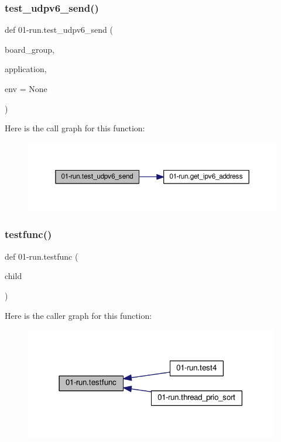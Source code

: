 \subsubsection{\texorpdfstring{test\+\_\+udpv6\+\_\+send()}{test\_udpv6\_send()}}
{\footnotesize\ttfamily def 01-\/run.\+test\+\_\+udpv6\+\_\+send (\begin{DoxyParamCaption}\item[{}]{board\+\_\+group,  }\item[{}]{application,  }\item[{}]{env = {\ttfamily None} }\end{DoxyParamCaption})}

Here is the call graph for this function\+:
\nopagebreak
\begin{figure}[H]
\begin{center}
\leavevmode
\includegraphics[width=350pt]{namespace01-run_a498ff87ebeb18334cf6110214d60bb53_cgraph}
\end{center}
\end{figure}
\mbox{\label{namespace01-run_aff983ffd4ab0e6bf8e7e58970e4a10bb}} 
\subsubsection{\texorpdfstring{testfunc()}{testfunc()}}
{\footnotesize\ttfamily def 01-\/run.\+testfunc (\begin{DoxyParamCaption}\item[{}]{child }\end{DoxyParamCaption})}

Here is the caller graph for this function\+:
\nopagebreak
\begin{figure}[H]
\begin{center}
\leavevmode
\includegraphics[width=314pt]{namespace01-run_aff983ffd4ab0e6bf8e7e58970e4a10bb_icgraph}
\end{center}
\end{figure}
\mbox{\label{namespace01-run_a9a3d0f55b0b22faa1021654ea4bd5f66}} 
